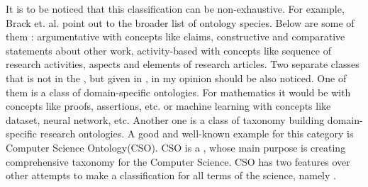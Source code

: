 		It is to be noticed that this classification can be non-exhaustive. For example, Brack et. al. point out to the broader list of ontology species. Below are some of them\cite{Bra20} : argumentative with concepts like claims, constructive and comparative statements about other work, activity-based with concepts like sequence of research activities, aspects and elements of research articles. Two separate classes that is not in the \cite{Cor14}, but given in \cite{Bra20}, in my opinion should be also noticed. One of them is a class of domain-specific ontologies. For mathematics it would be with concepts like proofs, assertions, etc. or machine learning with concepts like dataset, neural network, etc. Another one is a class of taxonomy building domain-specific research ontologies. A good and well-known example for this category is Computer Science Ontology(CSO). CSO is a \frqq\cite[p.1]{CSO19}, whose main purpose is creating comprehensive taxonomy for the Computer Science. CSO has two features over other attempts to make a classification for all terms of the science, namely \frqq\cite[p.1]{CSO19}.  
		
